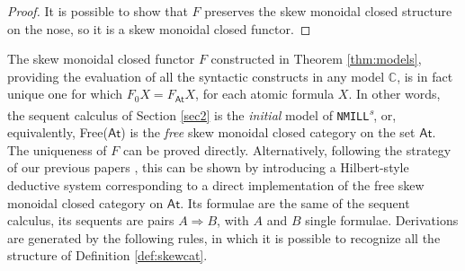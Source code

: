 \documentclass[submission,copyright,creativecommons]{eptcs}
\theoremstyle{definition}
\newtheorem{defn}{Definition}[section]
\newcommand{\NMILL}{\texttt{NMILL}}
\newcommand{\SkNMILL}{\NMILL\textsuperscript{\textit{s}}}
\newcommand{\FSkMCC}{\textsf{Free}}
\begin{document}
\begin{proof}
It is possible to show that $F$ preserves the skew monoidal closed structure on the nose, so it is a skew monoidal closed functor.
\end{proof}

The skew monoidal closed functor $F$ constructed in Theorem \ref{thm:models}, providing the evaluation of all the syntactic constructs in any model $\mathbb{C}$, is in fact unique one for which $F_0 X = F_{\mathsf{At}} X$, for each atomic formula $X$. In other words, the
sequent calculus of Section \ref{sec2} is the \emph{initial} model of \SkNMILL, or, equivalently, \FSkMCC($\mathsf{At}$) is the \emph{free} skew
monoidal closed category on the set $\mathsf{At}$. The uniqueness of $F$ can be proved directly.  Alternatively, following the strategy of our previous papers \cite{}, this can be shown by introducing a Hilbert-style deductive system corresponding to a direct implementation of the free skew monoidal closed category on $\mathsf{At}$. Its formulae are the same of the sequent calculus, its sequents are pairs $A \Longrightarrow B$, with $A$ and $B$ single formulae. Derivations are generated by the following rules, in which it is possible to  recognize all the structure of Definition \ref{def:skewcat}. 
\end{document}
